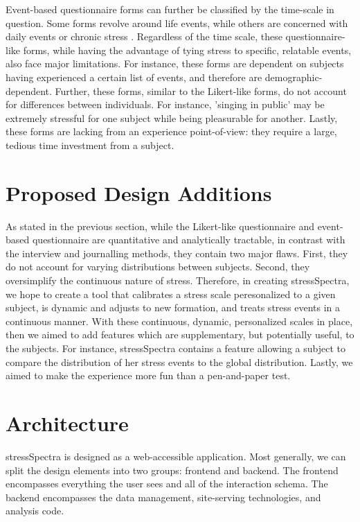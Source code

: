\documentclass{sigchi}
\begin{document}
Event-based questionnaire forms can further be classified by the time-scale in question. Some forms revolve around life events, while others are concerned with daily events or chronic stress \cite{macarthurResearch}. Regardless of the time scale, these questionnaire-like forms, while having the advantage of tying stress to specific, relatable events, also face major limitations. For instance, these forms are dependent on subjects having experienced a certain list of events, and therefore are demographic-dependent. Further, these forms, similar to the Likert-like forms, do not account for differences between individuals. For instance, 'singing in public' may be extremely stressful for one subject while being pleasurable for another. Lastly, these forms are lacking from an experience point-of-view: they require a large, tedious time investment from a subject.


\section{Proposed Design Additions}
As stated in the previous section, while the Likert-like questionnaire and event-based questionnaire are quantitative and analytically tractable, in contrast with the interview and journalling methods, they contain two major flaws. First, they do not account for varying distributions between subjects. Second, they oversimplify the continuous nature of stress.
Therefore, in creating stressSpectra, we hope to create a tool that calibrates a stress scale peresonalized to a given subject, is dynamic and adjusts to new formation, and treats stress events in a continuous manner.
With these continuous, dynamic, personalized scales in place, then we aimed to add features which are supplementary, but potentially useful, to the subjects. For instance, stressSpectra contains a feature allowing a subject to compare the distribution of her stress events to the global distribution. Lastly, we aimed to make the experience more fun than a pen-and-paper test.

\section{Architecture}
stressSpectra is designed as a web-accessible application. Most generally, we can split the design elements into two groups: frontend and backend. The frontend encompasses everything the user sees and all of the interaction schema. The backend encompasses the data management, site-serving technologies, and analysis code. 
\end{document}
